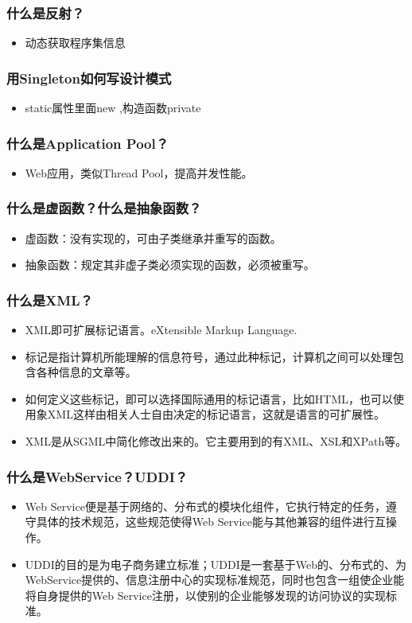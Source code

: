 \documentclass[9pt, b5paper]{article}
\begin{document}
\subsubsection{什么是反射？}
\label{sec-1-1-65}
\begin{itemize}
\item 动态获取程序集信息
\end{itemize}
\subsubsection{用Singleton如何写设计模式}
\label{sec-1-1-66}
\begin{itemize}
\item static属性里面new ,构造函数private
\end{itemize}
\subsubsection{什么是Application Pool？}
\label{sec-1-1-67}
\begin{itemize}
\item Web应用，类似Thread Pool，提高并发性能。
\end{itemize}
\subsubsection{什么是虚函数？什么是抽象函数？}
\label{sec-1-1-68}
\begin{itemize}
\item 虚函数：没有实现的，可由子类继承并重写的函数。
\item 抽象函数：规定其非虚子类必须实现的函数，必须被重写。
\end{itemize}
\subsubsection{什么是XML？}
\label{sec-1-1-69}
\begin{itemize}
\item XML即可扩展标记语言。eXtensible Markup Language.
\item 标记是指计算机所能理解的信息符号，通过此种标记，计算机之间可以处理包含各种信息的文章等。
\item 如何定义这些标记，即可以选择国际通用的标记语言，比如HTML，也可以使用象XML这样由相关人士自由决定的标记语言，这就是语言的可扩展性。
\item XML是从SGML中简化修改出来的。它主要用到的有XML、XSL和XPath等。
\end{itemize}
\subsubsection{什么是WebService？UDDI？}
\label{sec-1-1-70}
\begin{itemize}
\item Web Service便是基于网络的、分布式的模块化组件，它执行特定的任务，遵守具体的技术规范，这些规范使得Web Service能与其他兼容的组件进行互操作。
\item UDDI的目的是为电子商务建立标准；UDDI是一套基于Web的、分布式的、为WebService提供的、信息注册中心的实现标准规范，同时也包含一组使企业能将自身提供的Web Service注册，以使别的企业能够发现的访问协议的实现标准。
\end{itemize}
\end{document}
